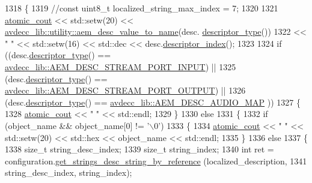 \begin{DoxyCode}
1318 \{
1319     \textcolor{comment}{//const uint8\_t localized\_string\_max\_index = 7;}
1320 
1321     \hyperlink{cmd__line_8h_a0bc38ccc65c79ba06c6fcd7b4bf554c3}{atomic\_cout} << std::setw(20) << 
      \hyperlink{namespaceavdecc__lib_1_1utility_a6bdd02679e5a911a071d4aa03be341f0}{avdecc\_lib::utility::aem\_desc\_value\_to\_name}(desc.
      \hyperlink{classavdecc__lib_1_1descriptor__base_a5112b70022171063ec5d3242bee9910e}{descriptor\_type}())
1322                 << \textcolor{stringliteral}{"   "} << std::setw(16) << std::dec << desc.\hyperlink{classavdecc__lib_1_1descriptor__base_a7eed5583bffdf72d89021b188648c1b5}{descriptor\_index}();
1323 
1324     \textcolor{keywordflow}{if} ((desc.\hyperlink{classavdecc__lib_1_1descriptor__base_a5112b70022171063ec5d3242bee9910e}{descriptor\_type}() == 
      \hyperlink{namespaceavdecc__lib_ac7b7d227e46bc72b63ee9e9aae15902fa54a680de439da84c5d5037a246d55b3f}{avdecc\_lib::AEM\_DESC\_STREAM\_PORT\_INPUT}) ||
1325         (desc.\hyperlink{classavdecc__lib_1_1descriptor__base_a5112b70022171063ec5d3242bee9910e}{descriptor\_type}() == 
      \hyperlink{namespaceavdecc__lib_ac7b7d227e46bc72b63ee9e9aae15902fa2b2dca37bb2c945a2b37b02231650b48}{avdecc\_lib::AEM\_DESC\_STREAM\_PORT\_OUTPUT}) ||
1326         (desc.\hyperlink{classavdecc__lib_1_1descriptor__base_a5112b70022171063ec5d3242bee9910e}{descriptor\_type}() == \hyperlink{namespaceavdecc__lib_ac7b7d227e46bc72b63ee9e9aae15902fab7cc7534edb71a30193e3c41bf920cf5}{avdecc\_lib::AEM\_DESC\_AUDIO\_MAP}
      ))
1327     \{
1328         \hyperlink{cmd__line_8h_a0bc38ccc65c79ba06c6fcd7b4bf554c3}{atomic\_cout} << \textcolor{stringliteral}{"   "} << std::endl;
1329     \}
1330     \textcolor{keywordflow}{else}
1331     \{
1332         \textcolor{keywordflow}{if} (object\_name && object\_name[0] != \textcolor{charliteral}{'\(\backslash\)0'})
1333         \{
1334             \hyperlink{cmd__line_8h_a0bc38ccc65c79ba06c6fcd7b4bf554c3}{atomic\_cout} << \textcolor{stringliteral}{"   "} << std::setw(20) << std::hex << object\_name << std::endl;
1335         \}
1336         \textcolor{keywordflow}{else}
1337         \{
1338             \textcolor{keywordtype}{size\_t} string\_desc\_index;
1339             \textcolor{keywordtype}{size\_t} string\_index;
1340             \textcolor{keywordtype}{int} ret = configuration.\hyperlink{classavdecc__lib_1_1configuration__descriptor_a3f384e636a80f7a66b477b1d7963b347}{get\_strings\_desc\_string\_by\_reference}
      (localized\_description,
1341                                                                          string\_desc\_index, string\_index);

\end{DoxyCode}
